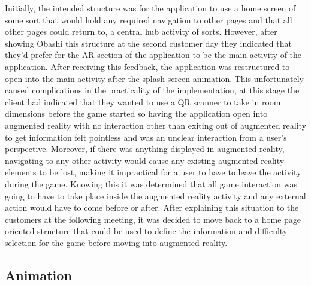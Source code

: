 \documentclass{l3proj}
\begin{document}
Initially, the intended structure was for the application to use a home screen of some sort that would hold any required navigation to other pages and that all other pages could return to, a central hub activity of sorts. However, after showing Obashi this structure at the second customer day they indicated that they’d prefer for the AR section of the application to be the main activity of the application. After receiving this feedback, the application was restructured to open into the main activity after the splash screen animation. This unfortunately caused complications in the practicality of the implementation, at this stage the client had indicated that they wanted to use a QR scanner to take in room dimensions before the game started so having the application open into augmented reality with no interaction other than exiting out of augmented reality to get information felt pointless and was an unclear interaction from a user's perspective. Moreover, if there was anything displayed in augmented reality, navigating to any other activity would cause any existing augmented reality elements to be lost, making it impractical for a user to have to leave the activity during the game. Knowing this it was determined that all game interaction was going to have to take place inside the augmented reality activity and any external action would have to come before or after. After explaining this situation to the customers at the following meeting, it was decided to move back to a home page oriented structure that could be used to define the information and difficulty selection for the game before moving into augmented reality. 

\subsection{Animation}
\end{document}
